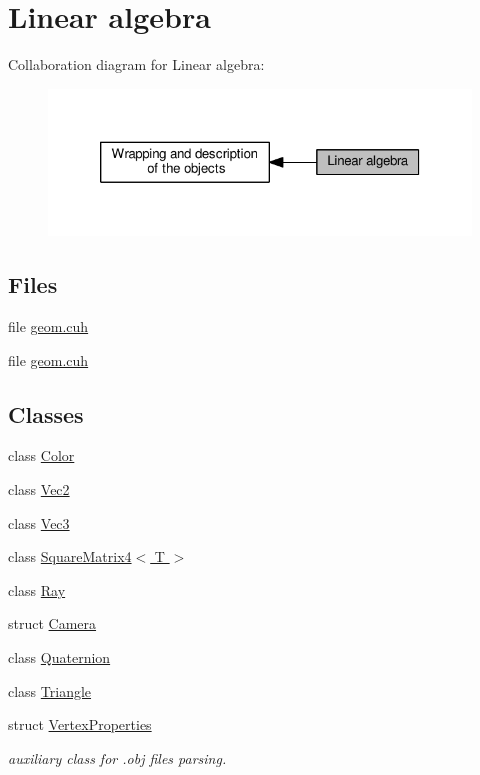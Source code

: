 \hypertarget{group__linear__algebra}{}\section{Linear algebra}
\label{group__linear__algebra}
Collaboration diagram for Linear algebra\+:\nopagebreak
\begin{figure}[H]
\begin{center}
\leavevmode
\includegraphics[width=320pt]{group__linear__algebra}
\end{center}
\end{figure}
\subsection*{Files}
\begin{DoxyCompactItemize}
\item 
file \hyperlink{r_t_tracer_2include_2geom_8cuh}{geom.\+cuh}
\item 
file \hyperlink{cuda_tracer__0__1_2include_2geom_8cuh}{geom.\+cuh}
\end{DoxyCompactItemize}
\subsection*{Classes}
\begin{DoxyCompactItemize}
\item 
class \hyperlink{class_color}{Color}
\item 
class \hyperlink{class_vec2}{Vec2}
\item 
class \hyperlink{class_vec3}{Vec3}
\item 
class \hyperlink{class_square_matrix4}{Square\+Matrix4$<$ T $>$}
\item 
class \hyperlink{class_ray}{Ray}
\item 
struct \hyperlink{struct_camera}{Camera}
\item 
class \hyperlink{class_quaternion}{Quaternion}
\item 
class \hyperlink{class_triangle}{Triangle}
\item 
struct \hyperlink{struct_vertex_properties}{Vertex\+Properties}
\begin{DoxyCompactList}\small\item\em auxiliary class for .obj files parsing. \end{DoxyCompactList}\end{DoxyCompactItemize}
